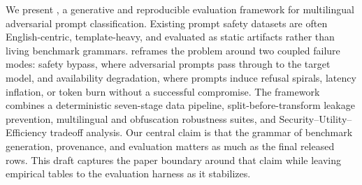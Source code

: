 We present \system, a generative and reproducible evaluation framework for multilingual adversarial prompt classification. Existing prompt safety datasets are often English-centric, template-heavy, and evaluated as static artifacts rather than living benchmark grammars. \system reframes the problem around two coupled failure modes: safety bypass, where adversarial prompts pass through to the target model, and availability degradation, where prompts induce refusal spirals, latency inflation, or token burn without a successful compromise. The framework combines a deterministic seven-stage data pipeline, split-before-transform leakage prevention, multilingual and obfuscation robustness suites, and Security--Utility--Efficiency tradeoff analysis. Our central claim is that the grammar of benchmark generation, provenance, and evaluation matters as much as the final released rows. This draft captures the paper boundary around that claim while leaving empirical tables to the evaluation harness as it stabilizes.
